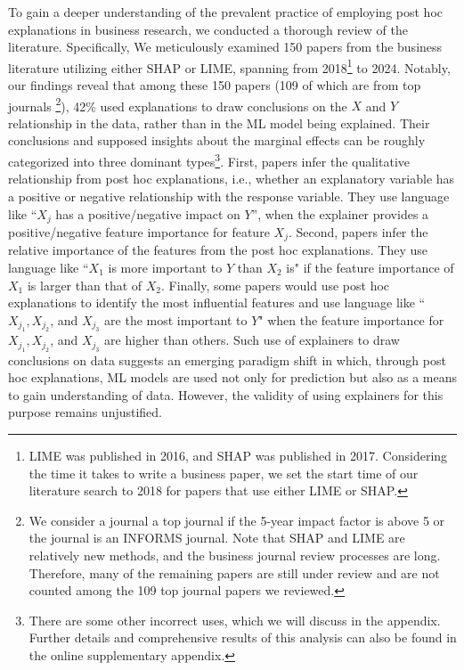 \documentclass[mnsc,blindrev]{informs3}
\begin{document}
To gain a deeper understanding of the prevalent practice of employing post hoc explanations in business research, we conducted a thorough review of the literature. Specifically, We meticulously examined 150 papers from the business literature utilizing either SHAP or LIME, spanning from 2018\footnote{LIME was published in 2016, and SHAP was published in 2017. Considering the time it takes to write a business paper, we set the start time of our literature search to 2018 for papers that use either LIME or SHAP.} to 2024. Notably, our findings reveal that among these 150 papers (109 of which are from top journals \footnote{We consider a journal a top journal if the 5-year impact factor is above 5 or the journal is an INFORMS journal. Note that SHAP and LIME are relatively new methods, and the business journal review processes are long. Therefore, many of the remaining papers are still under review and are not counted among the 109 top journal papers we reviewed.}), 42\% used explanations to draw conclusions on the $X$ and $Y$ relationship in the data, rather than in the ML model being explained. Their conclusions and supposed insights about the marginal effects can be roughly categorized into three dominant types\footnote{There are some other incorrect uses, which we will discuss in the appendix. Further details and comprehensive results of this analysis can also be found in the online supplementary  appendix.}. First, papers infer the qualitative relationship from post hoc explanations, i.e., whether an explanatory variable has a positive or negative relationship with the response variable. They use language like ``$X_j$ has a positive/negative impact on $Y$'', when the explainer provides a positive/negative feature importance for feature $X_j$. Second, papers infer the relative importance of the features from the post hoc explanations. They use language like ``$X_1$ is more important to $Y$ than $X_2$ is" if the feature importance of $X_1$ is larger than that of $X_2$. Finally, some papers would use post hoc explanations to identify the most influential features and use language like ``$X_{j_1}, X_{j_2}$, and $X_{j_3}$ are the most important to $Y$" when the feature importance for $X_{j_1}, X_{j_2}$, and $X_{j_3}$ are higher than others. 
Such use of explainers to draw conclusions on data suggests an emerging paradigm shift in which, through post hoc explanations, ML models are used not only for prediction but also as a means to gain understanding of data. However, the validity of using explainers for this purpose remains unjustified. 
\end{document}
